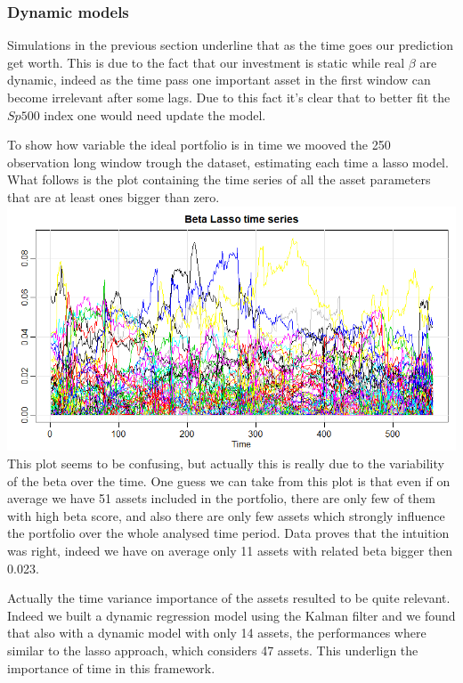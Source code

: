 \documentclass{article}%
\begin{document}
\subsubsection{Dynamic models}

Simulations in the previous section underline that as the time goes our prediction get worth. This is due to the fact that our investment is static while real $\beta$ are dynamic, indeed as the time pass one important asset in the first window can become irrelevant after some lags. Due to this fact it's clear that to better fit the $Sp500$ index one would need update the model.

To show how variable the ideal portfolio is in time we mooved the 250 observation long window trough the dataset, estimating each time a lasso model. What follows is the plot containing the time series of all the asset parameters that are at least ones bigger than zero.
\\

\includegraphics[scale=0.60]{betatime}
\\

This plot seems to be confusing, but actually this is really due to the variability of the beta over the time. One guess we can take from this plot is that even if on average we have 51 assets included in the portfolio, there are only few of them with high beta score, and also there are only few assets which strongly influence the portfolio over the whole analysed time period. Data proves that the intuition was right, indeed we have on average only 11 assets with related beta bigger then 0.023. 

Actually the time variance importance of the assets resulted to be quite relevant. Indeed we built a dynamic regression model using the Kalman filter and we found that also with a dynamic model with only 14 assets, the performances where similar to the lasso approach, which considers 47 assets. This underlign the importance of time in this framework.
\end{document}

